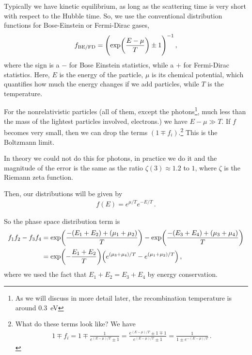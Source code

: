 \documentclass[main.tex]{subfiles}
\begin{document}

Typically we have kinetic equilibrium, as long as the scattering time is very short with respect to the Hubble time. 
So, we use the conventional distribution functions for Bose-Einstein or Fermi-Dirac gases,
%
\begin{align}
f_{\text{BE/FD}} = \qty(\exp(\frac{E- \mu }{T}) \pm 1)^{-1}
\,,
\end{align}
%
where the sign is a \(-\) for Bose Einstein statistics, while a \(+\) for Fermi-Dirac statistics. 
Here, \(E\) is the energy of the particle, \(\mu \) is its chemical potential, which quantifies how much the energy changes if we add particles, while \(T\) is the temperature. 

For the nonrelativistic particles (all of them, except the photons\footnote{As we will discuss in more detail later, the recombination temperature is around \SI{.3}{eV}}, much less than the mass of the lightest particles involved, electrons.) we have \(E - \mu \gg T\). 
If \(f\) becomes very small, then we can drop the terms \((1 \mp f_i)\).\footnote{What do these terms look like? We have 
%
\begin{align}
1 \mp f_i = 1 \mp \frac{1}{e^{(E-\mu ) / T} \pm 1}
= \frac{e^{(E - \mu ) / T} \pm 1 \mp 1}{e^{(E- \mu ) / T} \pm 1 }
= \frac{1}{1 \pm e^{- (E - \mu ) / T}}
\,.
\end{align}
%
} This is the Boltzmann limit. 

In theory we could not do this for photons, in practice we do it and the magnitude of the error is the same as the ratio \(\zeta (3) \approx 1.2\) to \(1\), where \(\zeta \) is the Riemann zeta function. 

Then, our distributions will be given by 
%
\begin{align}
f(E) = e^{ \mu / T} e^{- E/ T}
\,.
\end{align}

So the phase space distribution term is 
%
\begin{subequations}
\begin{align}
f_1 f_2 - f_3 f_4 &= \exp(\frac{-(E_1 + E_2 ) + (\mu_1 +\mu_2 )}{T})
- \exp(\frac{-(E_3 + E_4) + (\mu_3 +\mu_4 )}{T})\\
&=\exp(- \frac{E_1 + E_2 }{T} ) \qty(e^{(\mu_3 + \mu_4 ) / T} - e^{(\mu_1 + \mu_2 ) / T})
\,,
\end{align}
\end{subequations}
%
where we used the fact that \(E_1 + E_2 = E_3 + E_4 \) by energy conservation. 
\end{document}
